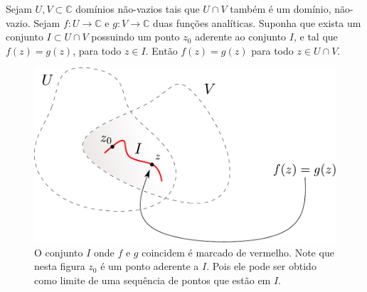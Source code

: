 \bigskip 


\begin{teorema}
\label{teo-principio-identidade}
Sejam $U,V\subset \mathbb{C}$ domínios não-vazios tais que $U\cap V$ também é um domínio,
não-vazio. Sejam $f:U\to\mathbb{C}$ e $g:V\to\mathbb{C}$ duas funções analíticas. Suponha que
exista um conjunto $I\subset U\cap V$ possuindo um ponto $z_0$ aderente ao conjunto $I$, e 
tal que $f(z)=g(z)$, para todo $z\in I$. 
Então $f(z)=g(z)$ para todo $z\in U\cap V$.
\end{teorema}

\begin{figure}[h]
\centering
\includegraphics[width=0.65\linewidth]{Figuras/zeros-isolados4}
\caption{O conjunto $I$ onde $f$ e $g$ coincidem é marcado de vermelho. Note que nesta figura $z_0$ é um ponto aderente a $I$. Pois ele pode ser obtido como limite de uma
sequência de pontos que estão em $I$.}
\label{fig:zeros-isolados4}
\end{figure}



